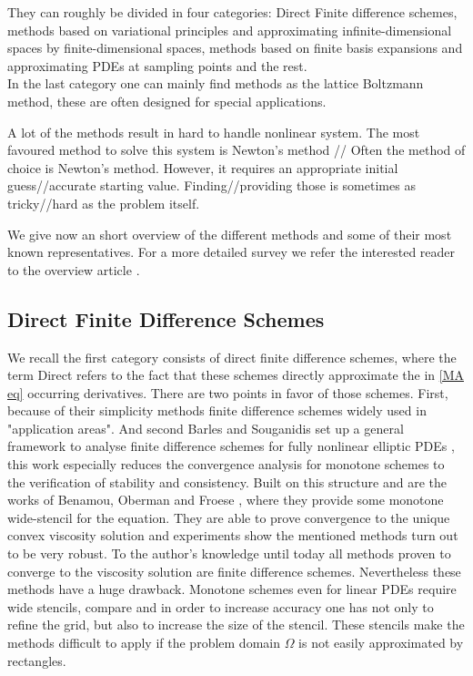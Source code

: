 They can roughly be divided in four categories: Direct Finite difference schemes, methods based on variational principles and approximating infinite-dimensional spaces by finite-dimensional spaces, methods based on finite basis expansions and approximating PDEs at sampling points and the rest. \\
In the last category one can mainly find methods as the lattice Boltzmann method, these are often designed for special applications.

A lot of the methods result in hard to handle nonlinear system. The most favoured method to solve this system is Newton's method // Often the method of choice is Newton's method. However, it requires an appropriate initial guess//accurate starting value. Finding//providing those is sometimes as tricky//hard as the problem itself.

We give now an short overview of the different methods and some of their most known representatives. For a more detailed survey we refer the interested reader to the overview article \cite[Section 2.1]{FGN2013}.


\subsection{Direct Finite Difference Schemes}

We recall the first category consists of direct finite difference schemes, where the term Direct refers to the fact that these schemes directly approximate the in \eqref{MA eq} occurring derivatives. 
There are two points in favor of those schemes. First, because of their simplicity methods finite difference schemes widely used in "application areas".  And second Barles and Souganidis set up a general framework to analyse finite difference schemes for fully nonlinear elliptic PDEs \cite{BS1991}, this work especially reduces the convergence analysis for monotone schemes to the verification of stability and consistency.
Built on this structure and are the works of Benamou, Oberman and Froese \cite{BFO2010, Oberman2008, FO2011}, where they provide some monotone wide-stencil for the \MA equation.
They are able to prove convergence to the unique convex viscosity solution and experiments show the mentioned methods turn out to be very robust. To the author's knowledge until today all methods proven to converge to the viscosity solution are finite difference schemes.
Nevertheless these methods have a huge drawback. Monotone schemes even for linear PDEs require wide stencils, compare \cite{MW1953}  and in order to increase accuracy one has not only to refine the grid, but also to increase the size of the stencil. These stencils make the methods difficult to apply if the problem domain $\Omega$ is not easily approximated by rectangles.

